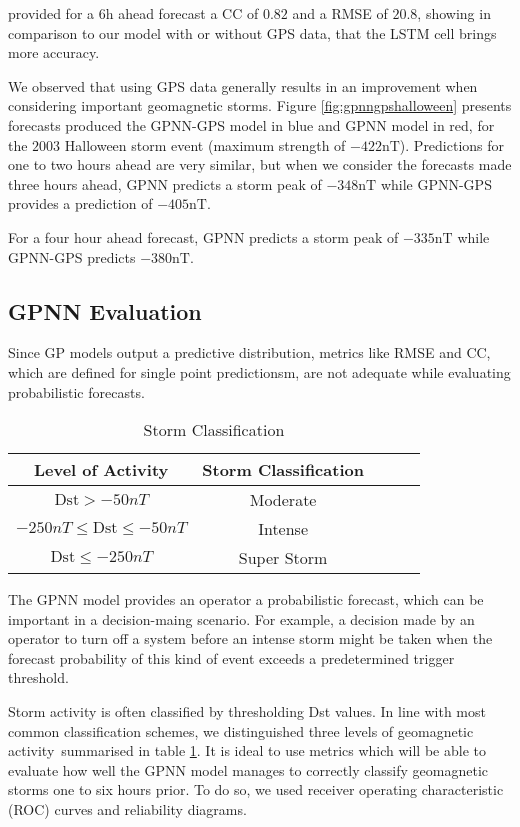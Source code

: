 \citet{wu1997geomagnetic} provided for a 6h ahead forecast a CC of $0.82$ and a RMSE of $20.8$, showing 
in comparison to our model with or without GPS data, that the LSTM cell brings more accuracy. 


We observed that using GPS data generally results in an improvement when considering important geomagnetic storms. Figure \ref{fig:gpnngpshalloween} presents forecasts produced the GPNN-GPS model in blue and GPNN model in red, 
for the $2003$ Halloween storm event (maximum strength of $-422 \text{nT}$). Predictions for one to two hours 
ahead are very similar, but when we consider the forecasts made three hours ahead, GPNN predicts a storm peak 
of $-348 \text{nT}$ while GPNN-GPS provides a prediction of $-405 \text{nT}$. 

For a four hour ahead forecast, GPNN predicts a storm peak of $-335 \text{nT}$ while GPNN-GPS predicts $-380 \text{nT}$.



\subsection{GPNN Evaluation}

Since GP models output a predictive distribution, metrics like RMSE and CC, which are defined for single point 
predictionsm, are not adequate while evaluating probabilistic forecasts.

\begin{table}[h]
	\centering
	\caption{Storm Classification}
	\label{table:stormclass}
	\begin{tabular}{ccccc}
	\hline
	Level of Activity & Storm Classification \\ \hline
	$\text{Dst} > -50 nT$ & Moderate\\
	$-250 nT \leq \text{Dst} \leq -50 nT$ & Intense\\
	$\text{Dst} \leq -250 nT$ & Super Storm\\ \hline
	\end{tabular}
\end{table}

The GPNN model provides an operator a probabilistic forecast, which can be important in a decision-maing scenario. 
For example, a decision made by an operator to turn off a system before an intense storm might be taken 
when the forecast probability of this kind of event exceeds a predetermined trigger threshold.

Storm activity is often classified by thresholding Dst values. In line with most common classification schemes, 
we distinguished three levels of geomagnetic activity summarised in table \ref{table:stormclass}. It is ideal to 
use metrics which will be able to evaluate how well the GPNN model manages to correctly classify geomagnetic 
storms one to six hours prior. To do so, we used receiver operating characteristic (ROC) curves and 
reliability diagrams.




